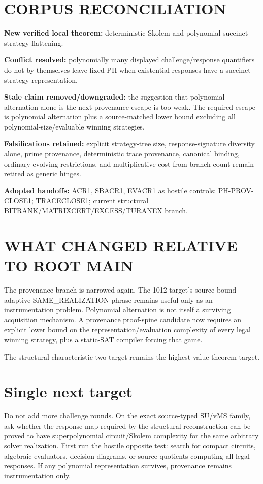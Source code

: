 \documentclass[11pt]{article}
\begin{document}
\section*{CORPUS RECONCILIATION}
\textbf{New verified local theorem:} deterministic-Skolem and polynomial-succinct-strategy flattening.

\textbf{Conflict resolved:} polynomially many displayed challenge/response quantifiers do not by themselves leave fixed PH when existential responses have a succinct strategy representation.

\textbf{Stale claim removed/downgraded:} the suggestion that polynomial alternation alone is the next provenance escape is too weak. The required escape is polynomial alternation plus a source-matched lower bound excluding all polynomial-size/evaluable winning strategies.

\textbf{Falsifications retained:} explicit strategy-tree size, response-signature diversity alone, prime provenance, deterministic trace provenance, canonical binding, ordinary evolving restrictions, and multiplicative cost from branch count remain retired as generic hinges.

\textbf{Adopted handoffs:} ACR1, SBACR1, EVACR1 as hostile controls; PH-PROV-CLOSE1; TRACECLOSE1; current structural BITRANK/MATRIXCERT/EXCESS/TURANEX branch.

\section*{WHAT CHANGED RELATIVE TO ROOT MAIN}
The provenance branch is narrowed again. The 1012 target's source-bound adaptive SAME\_REALIZATION phrase remains useful only as an instrumentation problem. Polynomial alternation is not itself a surviving acquisition mechanism. A provenance proof-spine candidate now requires an explicit lower bound on the representation/evaluation complexity of every legal winning strategy, plus a static-SAT compiler forcing that game.

The structural characteristic-two target remains the highest-value theorem target.

\section*{Single next target}
Do not add more challenge rounds. On the exact source-typed SU/vMS family, ask whether the response map required by the structural reconstruction can be proved to have superpolynomial circuit/Skolem complexity for the same arbitrary solver realization. First run the hostile opposite test: search for compact circuits, algebraic evaluators, decision diagrams, or source quotients computing all legal responses. If any polynomial representation survives, provenance remains instrumentation only.
\end{document}
